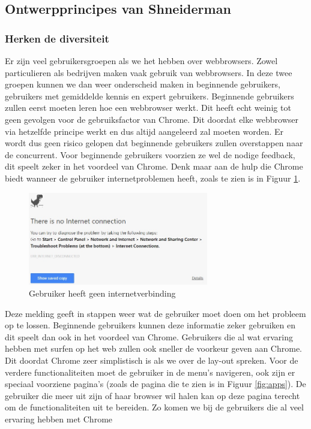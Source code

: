 \documentclass[12pt]{article}
\begin{document}
\subsection{Ontwerpprincipes van Shneiderman}
\subsubsection{Herken de diversiteit}
Er zijn veel gebruikersgroepen als we het hebben over webbrowsers. Zowel particulieren als bedrijven maken vaak gebruik van webbrowsers. In deze twee groepen kunnen we dan weer onderscheid maken in beginnende gebruikers, gebruikers met gemiddelde kennis en expert gebruikers. 
\linebreak
Beginnende gebruikers zullen eerst moeten leren hoe een webbrowser werkt. Dit heeft echt weinig tot geen gevolgen voor de gebruiksfactor van Chrome. Dit doordat elke webbrowser via hetzelfde principe werkt en dus altijd aangeleerd zal moeten worden. Er wordt dus geen risico gelopen dat beginnende gebruikers zullen overstappen naar de concurrent. Voor beginnende gebruikers voorzien ze wel de nodige feedback, dit speelt zeker in het voordeel van Chrome. Denk maar aan de hulp die Chrome biedt wanneer de gebruiker internetproblemen heeft, zoals te zien is in Figuur \ref{fig:nocon}.
\begin{figure}
  \centering
    \includegraphics[width=0.7\textwidth]{NoConnection.jpg}
  \caption{Gebruiker heeft geen internetverbinding}
  \label{fig:nocon}
\end{figure}
Deze melding geeft in stappen weer wat de gebruiker moet doen om het probleem op te lossen. Beginnende gebruikers kunnen deze informatie zeker gebruiken en dit speelt dan ook in het voordeel van Chrome.
\newpage
Gebruikers die al wat ervaring hebben met surfen op het web zullen ook sneller de voorkeur geven aan Chrome. Dit doordat Chrome zeer simplistisch is als we over de lay-out spreken. Voor de verdere functionaliteiten moet de gebruiker in de menu's navigeren, ook zijn er speciaal voorziene pagina's (zoals de pagina die te zien is in Figuur \ref{fig:apps}). De gebruiker die meer uit zijn of haar browser wil halen kan op deze pagina terecht om de functionaliteiten uit te bereiden. Zo komen we bij de gebruikers die al veel ervaring hebben met Chrome
\end{document}
